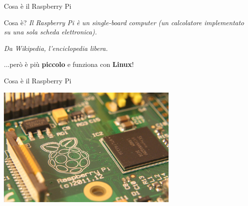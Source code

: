 \documentclass[xcolor=svgnames,11pt]{beamer}
\begin{document}
\begin{frame}{Cosa \`e il Raspberry Pi}
\begin{block}{Cosa \`e?}
\emph{
Il Raspberry Pi è un single-board computer (un calcolatore implementato su una sola scheda elettronica).}
\begin{flushright}
\begin{footnotesize}
\emph{Da Wikipedia, l'enciclopedia libera.}
\end{footnotesize}
\end{flushright}

\end{block}

\pause
\medskip

...per\`o \`e pi\`u \textbf{piccolo} e funziona con \textbf{Linux}!

\begin{center}
\end{center}

\end{frame}

\begin{frame}{Cosa \`e il Raspberry Pi}
\begin{center}
\includegraphics[width=9cm]{raspi-artistic.jpg}
\end{center}
\end{frame}
\end{document}
